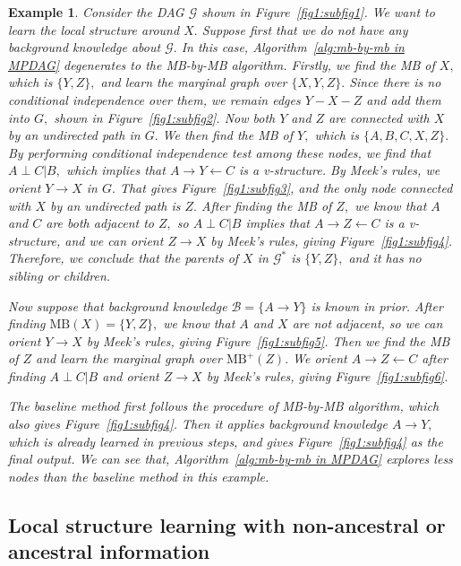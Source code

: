 \documentclass{article}
\newtheorem{example}{Example}
\begin{document}
\begin{example}
Consider the DAG $\mathcal{G}$ shown in Figure~\ref{fig1:subfig1}.
We want to learn the local structure around $X.$
Suppose first that we do not have any background knowledge about $\mathcal{G}.$
In this case, Algorithm~\ref{alg:mb-by-mb in MPDAG} degenerates to the MB-by-MB algorithm.
Firstly, we find the MB of $X,$ which is $\{Y,Z\},$ and learn the marginal graph over $\{X,Y,Z\}.$
Since there is no conditional independence over them, we remain edges $Y-X-Z$ and add them into $G,$ shown in Figure~\ref{fig1:subfig2}.
Now both $Y$ and $Z$ are connected with $X$ by an undirected path in $G.$
We then find the MB of $Y,$ which is $\{A,B,C,X,Z\}.$
By performing conditional independence test among these nodes, we find that $A\perp C|B,$ which implies that $A\to Y\leftarrow C$ is a v-structure.
By Meek's rules, we orient $Y\to X$ in $G.$
That gives Figure~\ref{fig1:subfig3}, and the only node connected with $X$ by an undirected path is $Z.$
After finding the MB of $Z,$ we know that $A$ and $C$ are both adjacent to $Z,$ so $A\perp C|B$ implies that $A\to Z\leftarrow C$ is a v-structure, and we can orient $Z\to X$ by Meek's rules, giving Figure~\ref{fig1:subfig4}.
Therefore, we conclude that the parents of $X$ in $\mathcal{G}^*$ is $\{Y,Z\},$ and it has no sibling or children.

Now suppose that background knowledge $\mathcal{B}=\{A\to Y\}$ is known in prior.
After finding $\mathrm{MB}(X)=\{Y,Z\},$ we know that $A$ and $X$ are not adjacent, so we can orient $Y\to X$ by Meek's rules, giving Figure~\ref{fig1:subfig5}.
Then we find the MB of $Z$ and learn the marginal graph over $\mathrm{MB}^+(Z).$
We orient $A\to Z\leftarrow C$ after finding $A\perp C|B$ and orient $Z\to X$ by Meek's rules, giving Figure~\ref{fig1:subfig6}.

The baseline method first follows the procedure of MB-by-MB algorithm, which also gives Figure~\ref{fig1:subfig4}.
Then it applies background knowledge $A\to Y,$ which is already learned in previous steps, and gives Figure~\ref{fig1:subfig4} as the final output.
We can see that, Algorithm~\ref{alg:mb-by-mb in MPDAG} explores less nodes than the baseline method in this example.
\end{example}

\subsection{Local structure learning with non-ancestral or ancestral information}
\label{subsec:local learn non-ans}
\end{document}
